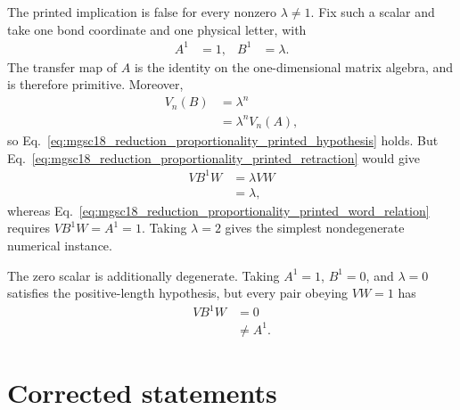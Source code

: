 \documentclass{article}
\begin{document}
The printed implication is false for every nonzero $\lambda\ne1$.  Fix such a
scalar and take one bond coordinate and one physical letter, with
\begin{align}
    A^1
        &=1,
    & B^1
        &=\lambda.
    \label{eq:mgsc18_reduction_proportionality_nonzero_example}
\end{align}
The transfer map of $A$ is the identity on the one-dimensional matrix algebra,
and is therefore primitive.  Moreover,
\begin{align}
    V_n(B)
        &=\lambda^n
    \label{eq:mgsc18_reduction_proportionality_nonzero_left_state}\\
        &=\lambda^n V_n(A),
    \label{eq:mgsc18_reduction_proportionality_nonzero_hypothesis}
\end{align}
so
Eq.~\ref{eq:mgsc18_reduction_proportionality_printed_hypothesis} holds.  But
Eq.~\ref{eq:mgsc18_reduction_proportionality_printed_retraction} would give
\begin{align}
    VB^1W
        &=\lambda VW
    \label{eq:mgsc18_reduction_proportionality_nonzero_reduction_first_step}\\
        &=\lambda,
    \label{eq:mgsc18_reduction_proportionality_nonzero_reduction_value}
\end{align}
whereas
Eq.~\ref{eq:mgsc18_reduction_proportionality_printed_word_relation} requires
$VB^1W=A^1=1$.  Taking $\lambda=2$ gives the simplest nondegenerate numerical
instance.

The zero scalar is additionally degenerate.  Taking $A^1=1$, $B^1=0$, and
$\lambda=0$ satisfies the positive-length hypothesis, but every pair obeying
$VW=1$ has
\begin{align}
    VB^1W
        &=0
    \label{eq:mgsc18_reduction_proportionality_zero_reduction_value}\\
        &\ne A^1.
    \label{eq:mgsc18_reduction_proportionality_zero_contradiction}
\end{align}

\section{Corrected statements}
\end{document}
